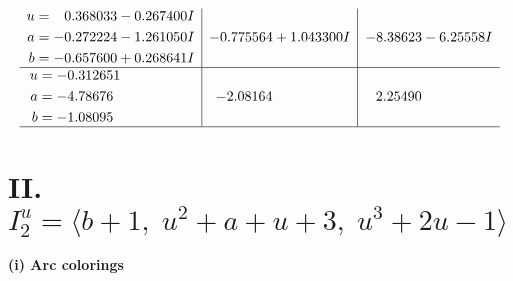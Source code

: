 \documentclass[1p]{elsarticle_modified}
\theoremstyle{definition}
\begin{document}
$$\begin{array}{c|c|c}
\begin{aligned}
u &= \phantom{-}0.368033 - 0.267400 I \\
a &= -0.272224 - 1.261050 I \\
b &= -0.657600 + 0.268641 I\end{aligned}
 & -0.775564 + 1.043300 I & -8.38623 - 6.25558 I \\ \hline\begin{aligned}
u &= -0.312651\phantom{ +0.000000I} \\
a &= -4.78676\phantom{ +0.000000I} \\
b &= -1.08095\phantom{ +0.000000I}\end{aligned}
 & -2.08164\phantom{ +0.000000I} & \phantom{-}2.25490\phantom{ +0.000000I}\\
 \hline 
 \end{array}$$\newpage\newpage\renewcommand{\arraystretch}{1}
\centering \section*{II. $I^u_{2}= \langle b+1,\;u^2+a+u+3,\;u^3+2 u-1 \rangle$}
\flushleft \textbf{(i) Arc colorings}\\
\end{document}
